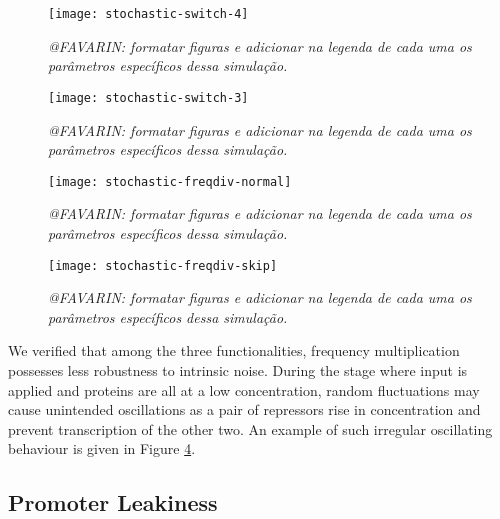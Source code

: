     \begin{figure}[!htbp]
      \centering
      \texttt{[image: stochastic-switch-4]}
      \caption{\textit{@FAVARIN: formatar figuras e adicionar na legenda de cada uma os parâmetros específicos dessa simulação.}}
      \label{fig.stochastic-switch-4}
    \end{figure}

    \begin{figure}[!htbp]
      \centering
      \texttt{[image: stochastic-switch-3]}
      \caption{\textit{@FAVARIN: formatar figuras e adicionar na legenda de cada uma os parâmetros específicos dessa simulação.}}
      \label{fig.stochastic-switch-3}
    \end{figure}

    \begin{figure}[!htbp]
      \centering
      \texttt{[image: stochastic-freqdiv-normal]}
      \caption{\textit{@FAVARIN: formatar figuras e adicionar na legenda de cada uma os parâmetros específicos dessa simulação.}}
      \label{fig.stochastic-freqdiv-normal}
    \end{figure}

    \begin{figure}[!htbp]
      \centering
      \texttt{[image: stochastic-freqdiv-skip]}
      \caption{\textit{@FAVARIN: formatar figuras e adicionar na legenda de cada uma os parâmetros específicos dessa simulação.}}
      \label{fig.stochastic-freqdiv-skip}
    \end{figure}

    We verified that among the three functionalities, frequency multiplication possesses less robustness to intrinsic noise.
    During the stage where input is applied and proteins are all at a low concentration, random fluctuations may cause unintended oscillations as a pair of repressors rise in concentration and prevent transcription of the other two.
    An example of such irregular oscillating behaviour is given in Figure \ref{fig.stochastic-freqdiv-skip}.


  \subsection{Promoter Leakiness}



